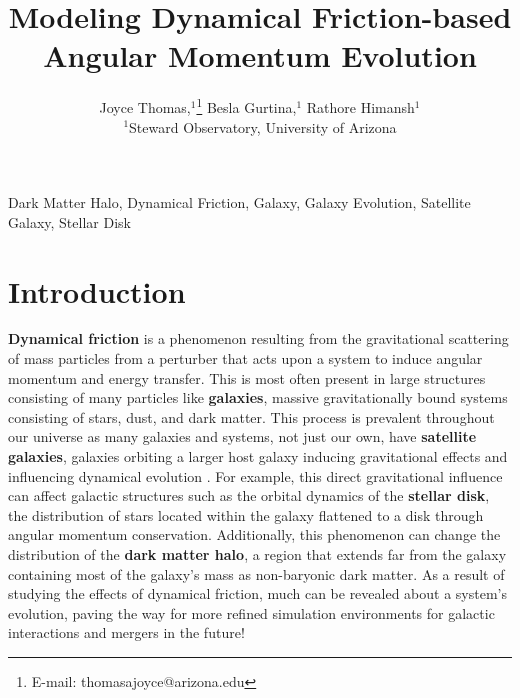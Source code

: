 \documentclass[fleqn,usenatbib]{mnras}
\title[Short title, max. 45 characters]{Modeling Dynamical Friction-based Angular Momentum Evolution}
\author[Joyce]{
Joyce Thomas,$^{1}$\thanks{E-mail: thomasajoyce@arizona.edu}
Besla Gurtina,$^{1}$
Rathore Himansh$^{1}$
\\
$^{1}$Steward Observatory, University of Arizona
}
\begin{document}
\label{firstpage}
\pagerange{\pageref{firstpage}--\pageref{lastpage}}
\maketitle



\begin{keywords}
Dark Matter Halo, Dynamical Friction, Galaxy, Galaxy Evolution, Satellite Galaxy, Stellar Disk
\end{keywords}



\section{Introduction}  %

\hspace{\parindent} \textbf{Dynamical friction} is a phenomenon resulting from the gravitational scattering of mass particles from a perturber that acts upon a system to induce angular momentum and energy transfer. This is most often present in large structures consisting of many particles like \textbf{galaxies}, massive gravitationally bound systems consisting of stars, dust, and dark matter. This process is prevalent throughout our universe as many galaxies and systems, not just our own, have \textbf{satellite galaxies}, galaxies orbiting a larger host galaxy inducing gravitational effects and influencing dynamical evolution \citep{Binney_Tremaine-2008}. For example, this direct gravitational influence can affect galactic structures such as the orbital dynamics of the \textbf{stellar disk}, the distribution of stars located within the galaxy flattened to a disk through angular momentum conservation. Additionally, this phenomenon can change the distribution of the \textbf{dark matter halo}, a region that extends far from the galaxy containing most of the galaxy's mass as non-baryonic dark matter. As a result of studying the effects of dynamical friction, much can be revealed about a system's evolution, paving the way for more refined simulation environments for galactic interactions and mergers in the future!

\vspace{10pt}
\end{document}
